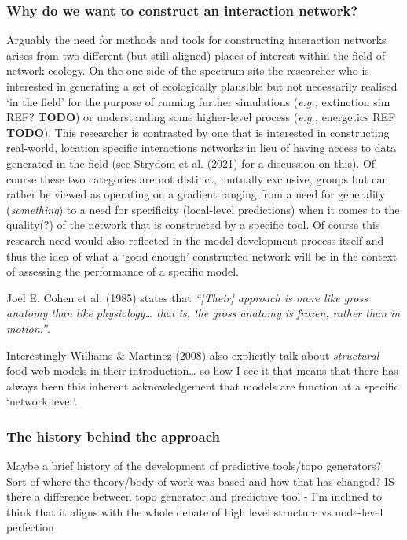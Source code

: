 \documentclass[
]{agujournal2019}
\begin{document}
\subsubsection{Why do we want to construct an interaction
network?}\label{why-do-we-want-to-construct-an-interaction-network}

Arguably the need for methods and tools for constructing interaction
networks arises from two different (but still aligned) places of
interest within the field of network ecology. On the one side of the
spectrum sits the researcher who is interested in generating a set of
ecologically plausible but not necessarily realised `in the field' for
the purpose of running further simulations (\emph{e.g.,} extinction sim
REF? \textbf{TODO}) or understanding some higher-level process
(\emph{e.g.,} energetics REF \textbf{TODO}). This researcher is
contrasted by one that is interested in constructing real-world,
location specific interactions networks in lieu of having access to data
generated in the field (see Strydom et al. (2021) for a discussion on
this). Of course these two categories are not distinct, mutually
exclusive, groups but can rather be viewed as operating on a gradient
ranging from a need for generality (\emph{something}) to a need for
specificity (local-level predictions) when it comes to the quality(?) of
the network that is constructed by a specific tool. Of course this
research need would also reflected in the model development process
itself and thus the idea of what a `good enough' constructed network
will be in the context of assessing the performance of a specific model.

Joel E. Cohen et al. (1985) states that \emph{``{[}Their{]} approach is
more like gross anatomy than like physiology\ldots{} that is, the gross
anatomy is frozen, rather than in motion.''}.

Interestingly Williams \& Martinez (2008) also explicitly talk about
\emph{structural} food-web models in their introduction\ldots{} so how I
see it that means that there has always been this inherent
acknowledgement that models are function at a specific `network level'.

\subsubsection{The history behind the
approach}\label{the-history-behind-the-approach}

Maybe a brief history of the development of predictive tools/topo
generators? Sort of where the theory/body of work was based and how that
has changed? IS there a difference between topo generator and predictive
tool - I'm inclined to think that it aligns with the whole debate of
high level structure vs node-level perfection
\end{document}
